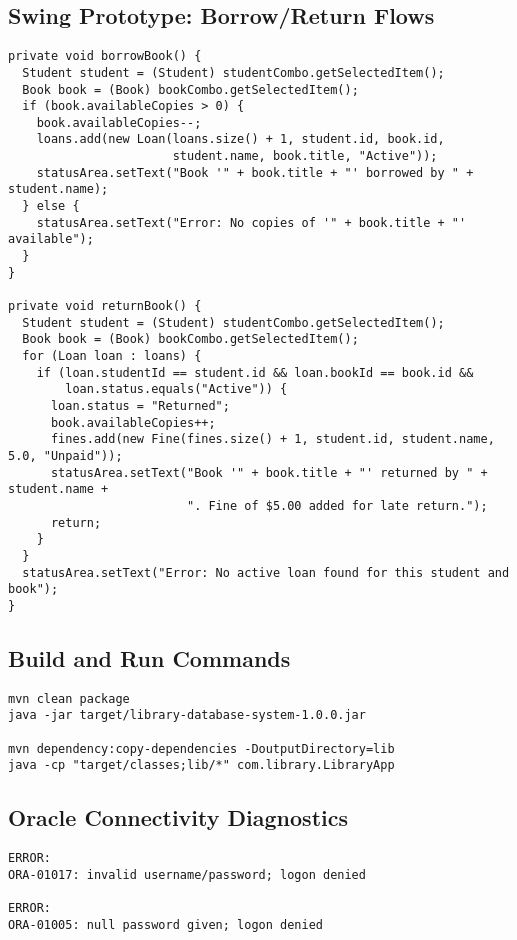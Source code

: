 \documentclass[12pt,a4paper]{article}
\begin{document}
\subsection{Swing Prototype: Borrow/Return Flows}
\begin{lstlisting}[style=java, caption=Borrow and return in Swing prototype]
private void borrowBook() {
  Student student = (Student) studentCombo.getSelectedItem();
  Book book = (Book) bookCombo.getSelectedItem();
  if (book.availableCopies > 0) {
    book.availableCopies--;
    loans.add(new Loan(loans.size() + 1, student.id, book.id,
                       student.name, book.title, "Active"));
    statusArea.setText("Book '" + book.title + "' borrowed by " + student.name);
  } else {
    statusArea.setText("Error: No copies of '" + book.title + "' available");
  }
}

private void returnBook() {
  Student student = (Student) studentCombo.getSelectedItem();
  Book book = (Book) bookCombo.getSelectedItem();
  for (Loan loan : loans) {
    if (loan.studentId == student.id && loan.bookId == book.id &&
        loan.status.equals("Active")) {
      loan.status = "Returned";
      book.availableCopies++;
      fines.add(new Fine(fines.size() + 1, student.id, student.name, 5.0, "Unpaid"));
      statusArea.setText("Book '" + book.title + "' returned by " + student.name +
                         ". Fine of $5.00 added for late return.");
      return;
    }
  }
  statusArea.setText("Error: No active loan found for this student and book");
}
\end{lstlisting}

\subsection{Build and Run Commands}
\begin{lstlisting}[style=java, caption=Build and run commands]
mvn clean package
java -jar target/library-database-system-1.0.0.jar

mvn dependency:copy-dependencies -DoutputDirectory=lib
java -cp "target/classes;lib/*" com.library.LibraryApp
\end{lstlisting}

\subsection{Oracle Connectivity Diagnostics}
\begin{lstlisting}[style=java, caption=Connectivity log excerpt]
ERROR:
ORA-01017: invalid username/password; logon denied

ERROR:
ORA-01005: null password given; logon denied
\end{lstlisting}

\end{document}

